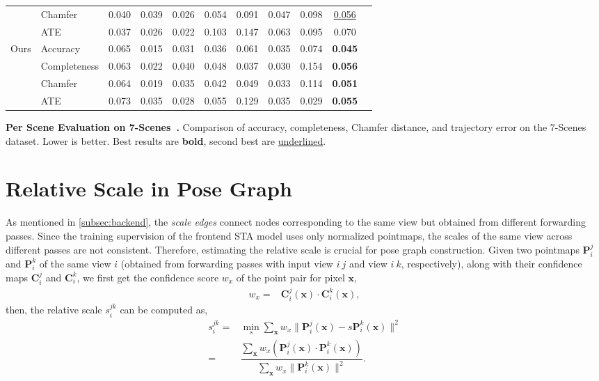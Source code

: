 \begin{strip}
\begin{tabular}{llccccccccc}
& Chamfer      & 0.040 & 0.039 & 0.026 & 0.054 & 0.091 & 0.047 & 0.098 & \underline{0.056} \\
& ATE   & 0.037 & 0.026 & 0.022 & 0.103 & 0.147 & 0.063 & 0.095 & 0.070 \\
\midrule
\multirow{4}{*}{Ours}
& Accuracy     & 0.065 & 0.015 & 0.031 & 0.036 & 0.061 & 0.035 & 0.074 & \bf{0.045} \\
& Completeness & 0.063 & 0.022 & 0.040 & 0.048 & 0.037 & 0.030 & 0.154 & \bf{0.056} \\
& Chamfer      & 0.064 & 0.019 & 0.035 & 0.042 & 0.049 & 0.033 & 0.114 & \bf{0.051} \\
& ATE   & 0.073 & 0.035 & 0.028 & 0.055 & 0.129 & 0.035 & 0.029 & \bf 0.055 \\
\bottomrule
\end{tabular}
\vspace{7pt}
\caption{\textbf{Per Scene Evaluation on 7-Scenes~\cite{shotton2013-7scenes}.} Comparison of accuracy, completeness, Chamfer distance, and trajectory error on the 7-Scenes dataset. Lower is better. Best results are \textbf{bold}, second best are \underline{underlined}.}
\label{tab:7scenes_results_full}
\vspace{4em}
\end{strip}






\section{Relative Scale in Pose Graph}
As mentioned in \cref{subsec:backend}, the \textit{scale edges} connect nodes corresponding to the same view but obtained from different forwarding passes. Since the training supervision of the frontend STA model uses only normalized pointmaps, the scales of the same view across different passes are not consistent. Therefore, estimating the relative scale is crucial for pose graph construction.
Given two pointmaps $\bm{P}_i^j$ and $\bm{P}_i^k$ of the same view $i$ (obtained from forwarding passes with input view $i\  j$ and view $i\ k$, respectively), along with their confidence maps $\bm{C}_i^j$ and $\bm{C}_i^k$, we first get the confidence score $w_{x}$ of the point pair for pixel $\bm x$,
\begin{align}
    w_{x} = &\bm C_i^j(\bm x) \cdot \bm C_i^k(\bm x), \nonumber
\end{align}
then, the relative scale $s_i^{jk}$ can be computed as,
\begin{align}
    s_i^{jk} =& \min_s \sum_{\bm x} w_{x}\| \bm P_i^j(\bm x)-s\bm P_i^k(\bm x) \|^2 \nonumber \\
    =& \dfrac{\sum_{\bm x}w_{x}(\bm P_i^j(\bm x)\cdot \bm P_i^k(\bm x))}{\sum_{\bm x}w_{x}\|\bm P_i^k(\bm x)\|^2}.
\end{align}



